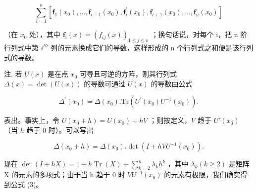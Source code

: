 \[
\sum_ {i = 1} ^ {n} \left[ \mathbf {f} _ {1} (x _ {0}), \dots , \mathbf {f} _ {i - 1} (x _ {0}), \mathbf {f} _ {i} ^ {\prime} (x _ {0}), \mathbf {f} _ {i + 1} (x _ {0}), \dots , \mathbf {f} _ {n} (x _ {0}) \right]
\]

（在 \(x_{0}\) 处），其中 \(\mathbf{f}_{i}(x)=(f_{ij}(x))_{1\leqslant j\leqslant n}\) ；换句话说，对每个 i，把 n 阶行列式中第 \(i^{th}\) 列的元素换成它们的导数，这样形成的 n 个行列式之和便是该行列式的导数。

注. 若 \(U(x)\) 是在点 \(x_{0}\) 可导且可逆的方阵，则其行列式 \(\Delta(x) = \det(U(x))\) 的导数可通过 \(U(x)\) 的导数由公式

\[
\varDelta^ {\prime} (x _ {0}) = \varDelta (x _ {0}). \mathrm{Tr} (U ^ {\prime} (x _ {0}) U ^ {- 1} (x _ {0})).\tag{3}
\]

表出。事实上，令 \(U(x_0 + h) = U(x_0) + hV\) ；则按定义，\(V\) 趋于 \(U'(x_0)\) （当 \(h\) 趋于 0 时）。可以写出

\[
\Delta (x _ {0} + h) = \Delta (x _ {0}). \det (I + h V U ^ {- 1} (x _ {0})).
\]

现在 \(\det(I + hX) = 1 + h\operatorname{Tr}(X) + \sum_{k=2}^{n} \lambda_k h^k\) ，其中 \(\lambda_k (k \geqslant 2)\) 是矩阵 X 的元素的多项式；由于当 h 趋于 0 时 \(VU^{-1}(x_0)\) 的元素有极限，我们确实得到公式 (3)。

